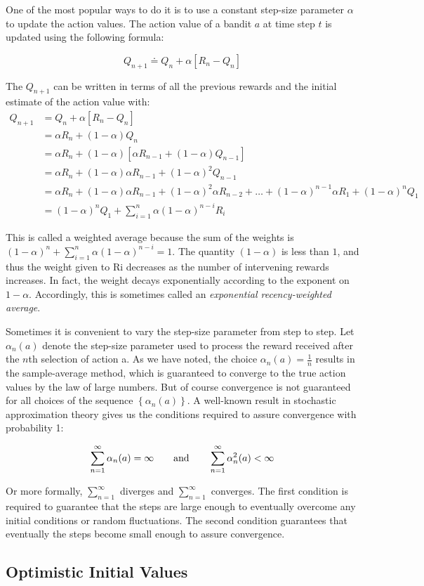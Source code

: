 One of the most popular ways to do it is to use a constant step-size parameter $\alpha$ to update the action values. The action value of a bandit $a$ at time step $t$ is updated using the following formula:

\begin{equation}
    Q_{n+1} \doteq Q_n + \alpha[R_n - Q_n]
\end{equation}

The $Q_{n+1}$ can be written in terms of all the previous rewards and the initial estimate of the action value with:
\begin{align*}
    Q_{n+1} &= Q_n + \alpha[R_n - Q_n] \\
    &= \alpha R_n + (1-\alpha)Q_n \\
    &= \alpha R_n + (1-\alpha)[\alpha R_{n-1} + (1-\alpha)Q_{n-1}] \\
    &= \alpha R_n + (1-\alpha)\alpha R_{n-1} + (1-\alpha)^2 Q_{n-1} \\
    &= \alpha R_n + (1-\alpha)\alpha R_{n-1} + (1-\alpha)^2\alpha R_{n-2} + \dots + (1-\alpha)^{n-1}\alpha R_1 + (1-\alpha)^nQ_1 \\
    &= (1-\alpha)^nQ_1 + \sum_{i=1}^{n}\alpha(1-\alpha)^{n-i}R_i
\end{align*}

This is called a weighted average because the sum of the weights is $(1-\alpha)^n+\sum_{i=1}^{n}\alpha(1-\alpha)^{n-i}=1$. The quantity $(1-\alpha)$ is less than $1$, and thus the weight given to Ri decreases as the number of intervening rewards increases. In fact, the weight decays exponentially according to the exponent on $1-\alpha$. Accordingly, this is sometimes called an \textit{exponential recency-weighted average}.

Sometimes it is convenient to vary the step-size parameter from step to step. Let $\alpha_n(a)$ denote the step-size parameter used to process the reward received after the $n$th selection of action a. As we have noted, the choice $\alpha_n(a) = \frac{1}{n}$ results in the sample-average method, which is guaranteed to converge to the true action values by the law of large numbers. But of course convergence is not guaranteed for all choices of the sequence $\left\{\alpha_n(a)\right\}$. A well-known result in stochastic approximation theory gives us the conditions required to assure convergence with probability 1:

\begin{equation}
    \sum_{n=1}^{\infty}\alpha_n(a) = \infty \quad\quad \text{and} \quad\quad \sum_{n=1}^{\infty}\alpha_n^2(a) < \infty\\
\end{equation}

Or more formally, $\sum_{n=1}^{\infty}$ diverges and $\sum_{n=1}^{\infty}$ converges. The first condition is required to guarantee that the steps are large enough to eventually overcome any initial conditions or random fluctuations. The second condition guarantees that eventually the steps become small enough to assure convergence.

\subsection{Optimistic Initial Values}
